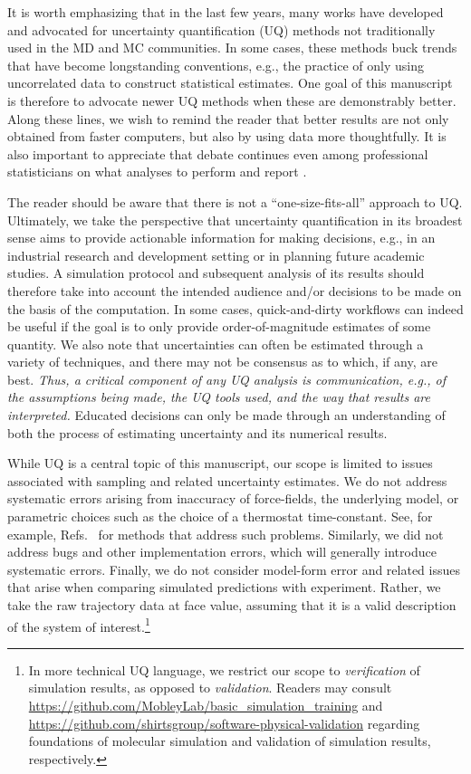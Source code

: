 It is worth emphasizing that in the last few years, many works have developed and advocated for uncertainty quantification (UQ) methods not traditionally used in the MD and MC communities.  In some cases, these methods buck trends that have become longstanding conventions, e.g., the practice of only using uncorrelated data to construct statistical estimates.  One goal of this manuscript is therefore to advocate newer UQ methods when these are demonstrably better.  Along these lines, we wish to remind the reader that better results are not only obtained from faster computers, but also by using data more thoughtfully.
It is also important to appreciate that debate continues even among professional statisticians on what analyses to perform and report \cite{Leek2017}.

The reader should be aware that there is not a ``one-size-fits-all'' approach to UQ.  Ultimately, we take the perspective that uncertainty quantification in its broadest sense aims to provide actionable information for making decisions, e.g., in an industrial research and development setting or in planning future academic studies.  A simulation protocol and subsequent analysis of its results should therefore take into account the intended audience and/or decisions to be made on the basis of the computation.  In some cases, quick-and-dirty workflows can indeed be useful if the goal is to only provide order-of-magnitude estimates of some quantity.  We also note that uncertainties can often be estimated through a variety of techniques, and there may not be consensus as to which, if any, are best.  {\it Thus, a critical component of any UQ analysis is communication, e.g., of the assumptions being made, the UQ tools used, and the way that results are interpreted.}  Educated decisions can only be made through an understanding of both the process of estimating uncertainty and its numerical results.

While UQ is a central topic of this manuscript, our scope is limited to issues associated with sampling and related uncertainty estimates.  We do not address systematic errors arising from inaccuracy of force-fields, the underlying model, or parametric choices such as the choice of a thermostat time-constant.  See, for example, Refs.~\cite{Leimkuhler,Rizzi2,Rizzi3,Rizzi4} for methods that address such problems.  Similarly, we did not address bugs and other implementation errors, which will generally introduce systematic errors. Finally, we do not consider model-form error and related issues that arise when comparing simulated predictions with experiment.  Rather, we take the raw trajectory data at face value, assuming that it is a valid description of the system of interest.\footnote{In more technical UQ language, we restrict our scope to {\it verification} of simulation results, as opposed to {\it validation}. Readers may consult \url{https://github.com/MobleyLab/basic_simulation_training} and \url{https://github.com/shirtsgroup/software-physical-validation} regarding foundations of molecular simulation and validation of simulation results, respectively.}
